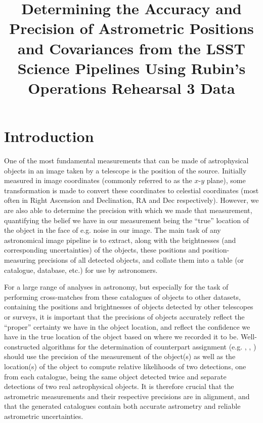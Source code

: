 \documentclass[SE,authoryear,toc]{lsstdoc}
\title[Determining the Accuracy and Precision of LSST Astrometric Positions and Covariances]{Determining the Accuracy and Precision of Astrometric Positions and Covariances from the LSST Science Pipelines Using Rubin's Operations Rehearsal 3 Data}
\date{\vcsDate}
\begin{document}
\maketitle

\section{Introduction}
\label{sec:intro}
One of the most fundamental measurements that can be made of astrophysical objects in an image taken by a telescope is the position of the source.
Initially measured in image coordinates (commonly referred to as the $x$-$y$ plane), some transformation is made to convert these coordinates to celestial coordinates (most often in Right Ascension and Declination, RA and Dec respectively).
However, we are also able to determine the precision with which we made that measurement, quantifying the belief we have in our measurement being the ``true'' location of the object in the face of e.g. noise in our image.
The main task of any astronomical image pipeline is to extract, along with the brightnesses (and corresponding uncertainties) of the objects, these positions and position-measuring precisions of all detected objects, and collate them into a table (or catalogue, database, etc.) for use by astronomers.

For a large range of analyses in astronomy, but especially for the task of performing cross-matches from these catalogues of objects to other datasets, containing the positions and brightnesses of objects detected by other telescopes or surveys, it is important that the precisions of objects accurately reflect the ``proper'' certainty we have in the object location, and reflect the confidence we have in the true location of the object based on where we recorded it to be.
Well-constructed algorithms for the determination of counterpart assignment (e.g. \citealp{Budavari:2008aa}, \citealp{2018MNRAS.473.5570W}, \citealp{Pineau:2017aa}) should use the precision of the measurement of the object(s) as well as the location(s) of the object to compute relative likelihoods of two detections, one from each catalogue, being the same object detected twice and separate detections of two real astrophysical objects.
It is therefore crucial that the astrometric measurements and their respective precisions are in alignment, and that the generated catalogues contain both accurate astrometry and reliable astrometric uncertainties.
\end{document}
